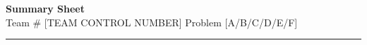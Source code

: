 %
%
%

\thispagestyle{empty}
\begin{center}
\vspace*{0.5cm}
{\Large\textbf{Summary Sheet}} \\[0.3cm]
{\large Team \# [TEAM CONTROL NUMBER] \quad Problem [A/B/C/D/E/F]}
\vspace{0.5cm}
\end{center}

\rule{\textwidth}{0.5pt}


